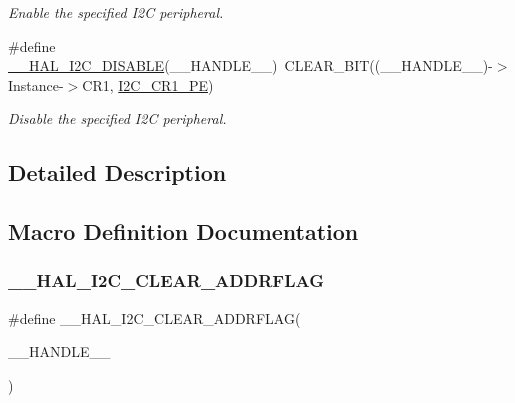 \begin{DoxyCompactItemize}
\begin{DoxyCompactList}\small\item\em Enable the specified I2C peripheral. \end{DoxyCompactList}\item 
\#define \hyperlink{group___i2_c___exported___macros_ga3d6a35da02ca72537a15570912c80412}{\+\_\+\+\_\+\+H\+A\+L\+\_\+\+I2\+C\+\_\+\+D\+I\+S\+A\+B\+LE}(\+\_\+\+\_\+\+H\+A\+N\+D\+L\+E\+\_\+\+\_\+)~C\+L\+E\+A\+R\+\_\+\+B\+IT((\+\_\+\+\_\+\+H\+A\+N\+D\+L\+E\+\_\+\+\_\+)-\/$>$Instance-\/$>$C\+R1, \hyperlink{group___peripheral___registers___bits___definition_ga953b0d38414808db79da116842ed3262}{I2\+C\+\_\+\+C\+R1\+\_\+\+PE})
\begin{DoxyCompactList}\small\item\em Disable the specified I2C peripheral. \end{DoxyCompactList}\end{DoxyCompactItemize}


\subsection{Detailed Description}


\subsection{Macro Definition Documentation}
\mbox{\label{group___i2_c___exported___macros_ga15a0a1a04971d44f9a1b82cab10af24f}} 
\subsubsection{\texorpdfstring{\+\_\+\+\_\+\+H\+A\+L\+\_\+\+I2\+C\+\_\+\+C\+L\+E\+A\+R\+\_\+\+A\+D\+D\+R\+F\+L\+AG}{\_\_HAL\_I2C\_CLEAR\_ADDRFLAG}}
{\footnotesize\ttfamily \#define \+\_\+\+\_\+\+H\+A\+L\+\_\+\+I2\+C\+\_\+\+C\+L\+E\+A\+R\+\_\+\+A\+D\+D\+R\+F\+L\+AG(\begin{DoxyParamCaption}\item[{}]{\+\_\+\+\_\+\+H\+A\+N\+D\+L\+E\+\_\+\+\_\+ }\end{DoxyParamCaption})}


